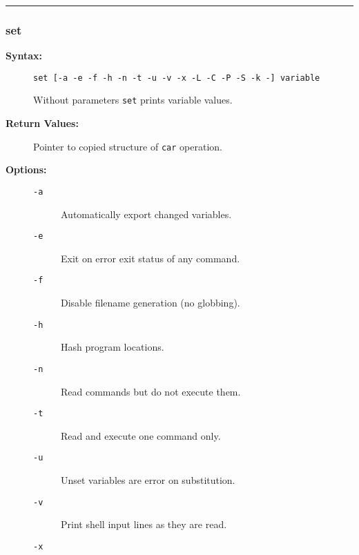 \hrule
\subsubsection{set}

\begin{description}
\item[{\bf Syntax:}] \mbox{}

{\tt set [-a -e -f -h -n -t -u -v -x -L -C -P -S -k -] variable}

Without parameters {\tt set} prints variable values.



\item[{\bf Return Values:}] \mbox{}

Pointer to copied structure of {\tt car} 
operation.

\item[{\bf Options:}] \mbox{}

\begin{description}
\item[{\tt -a}] \mbox{}

Automatically export changed variables.

\item[{\tt -e}] \mbox{}

Exit on error exit status of any command.

\item[{\tt -f}] \mbox{}

Disable filename generation (no globbing).

\item[{\tt -h}] \mbox{}

Hash program locations.

\item[{\tt -n}] \mbox{}

Read commands but do not execute them.

\item[{\tt -t}] \mbox{}

Read and execute one command only.

\item[{\tt -u}] \mbox{}

Unset variables are error on substitution.

\item[{\tt -v}] \mbox{}

Print shell input lines as they are read.

\item[{\tt -x}] \mbox{}


\end{description}
\end{description}
